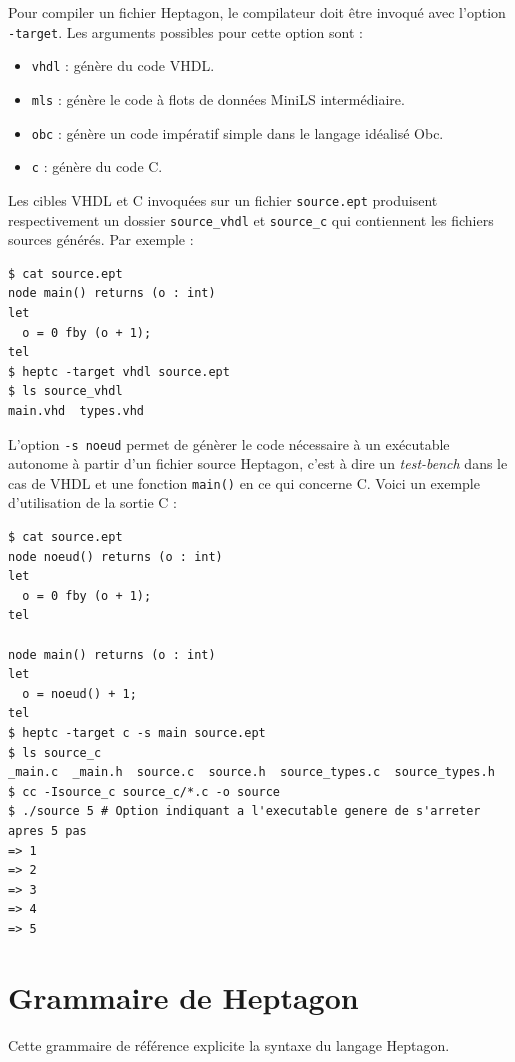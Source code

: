 \documentclass[a4paper]{article}
\newcommand{\LANG}{{\sc Heptagon}}
\begin{document}
Pour compiler un fichier \LANG, le compilateur doit \^etre invoqu\'e avec l'option
\verb/-target/. Les arguments possibles pour cette option sont :

\begin{itemize}
\item \verb/vhdl/ : g\'en\`ere du code VHDL.
\item \verb/mls/ : g\'en\`ere le code \`a flots de donn\'ees MiniLS interm\'ediaire.
\item \verb/obc/ : g\'en\`ere un code imp\'eratif simple dans le langage id\'ealis\'e Obc.
\item \verb/c/ : g\'en\`ere du code C.
\end{itemize}

Les cibles VHDL et C invoqu\'ees sur un fichier \verb/source.ept/ produisent
respectivement un dossier \verb/source_vhdl/ et \verb/source_c/ qui contiennent
les fichiers sources g\'en\'er\'es. Par exemple :

\begin{verbatim}
$ cat source.ept
node main() returns (o : int)
let
  o = 0 fby (o + 1);
tel
$ heptc -target vhdl source.ept
$ ls source_vhdl
main.vhd  types.vhd
\end{verbatim}

L'option \verb/-s noeud/ permet de g\'en\`erer le code n\'ecessaire \`a un
ex\'ecutable autonome \`a partir d'un fichier source \LANG, c'est \`a dire un
\textit{test-bench} dans le cas de VHDL et une fonction \verb/main()/ en ce qui
concerne C. Voici un exemple d'utilisation de la sortie C :

\begin{verbatim}
$ cat source.ept
node noeud() returns (o : int)
let
  o = 0 fby (o + 1);
tel

node main() returns (o : int)
let
  o = noeud() + 1;
tel
$ heptc -target c -s main source.ept
$ ls source_c
_main.c  _main.h  source.c  source.h  source_types.c  source_types.h
$ cc -Isource_c source_c/*.c -o source
$ ./source 5 # Option indiquant a l'executable genere de s'arreter apres 5 pas
=> 1
=> 2
=> 3
=> 4
=> 5
\end{verbatim}

\section{Grammaire de \LANG}

Cette grammaire de r\'ef\'erence explicite la syntaxe du langage Heptagon.

\newcommand{\sdash}{\mbox{-}}
\newcommand{\spow}{\text{\^{ }}}
\newcommand{\piquots}[1]{<<#1>>}
\end{document}
